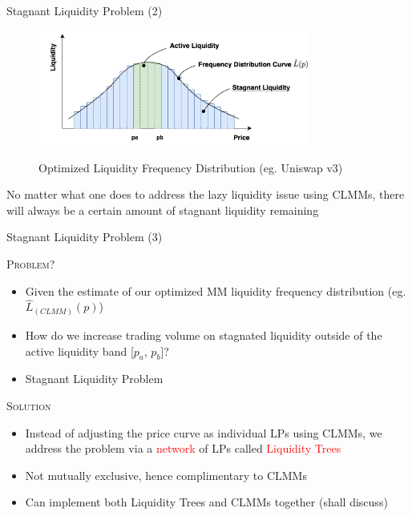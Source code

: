 \documentclass[10pt,xcolor=svgnames]{beamer} %
\newcommand{\red}[1]{\textcolor{red}{#1}}
\begin{document}
\begin{frame}{Stagnant Liquidity Problem (2)} 


\begin{figure}[h!]
\includegraphics[width=3.5in]{img/slp.png}
\label{fig:uniswap_v3}
\caption{Optimized Liquidity Frequency Distribution (eg. Uniswap v3)} 
\end{figure}

No matter what one does to address the lazy liquidity issue using CLMMs, there will always be a certain amount of stagnant liquidity remaining  

\end{frame}


\begin{frame}{Stagnant Liquidity Problem (3)} 

\begin{exampleblock}{\textsc{Problem?}}
\begin{itemize}
  \item Given the estimate of our optimized MM liquidity frequency distribution (eg. $\hat{L}_{(CLMM)}(p)$)
  \item How do we increase trading volume on stagnated liquidity outside of the active liquidity band [$p_{a}$, $p_{b}$]?
  \item Stagnant Liquidity Problem
\end{itemize}
\end{exampleblock}

\begin{exampleblock}{\textsc{Solution}}
\begin{itemize}
  \item Instead of adjusting the price curve as individual LPs using CLMMs, we address the problem via a \red{network} of LPs called \red{Liquidity Trees}
  \item Not mutually exclusive, hence complimentary to CLMMs 
  \item Can implement both Liquidity Trees and CLMMs together (shall discuss)
\end{itemize}
\end{exampleblock}

\vspace{7cm}

\end{frame}
\end{document}

